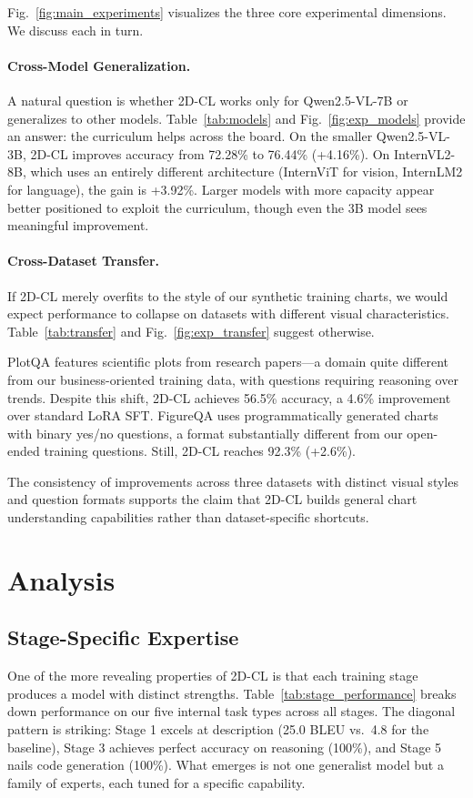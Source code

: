 \documentclass[journal]{IEEEtran}
\newcommand{\method}{2D-CL}
\begin{document}
Fig.~\ref{fig:main_experiments} visualizes the three core experimental dimensions. We discuss each in turn.

\paragraph{Cross-Model Generalization.}
A natural question is whether \method{} works only for Qwen2.5-VL-7B or generalizes to other models. Table~\ref{tab:models} and Fig.~\ref{fig:exp_models} provide an answer: the curriculum helps across the board. On the smaller Qwen2.5-VL-3B, \method{} improves accuracy from 72.28\% to 76.44\% (+4.16\%). On InternVL2-8B, which uses an entirely different architecture (InternViT for vision, InternLM2 for language), the gain is +3.92\%. Larger models with more capacity appear better positioned to exploit the curriculum, though even the 3B model sees meaningful improvement.

\paragraph{Cross-Dataset Transfer.}
If \method{} merely overfits to the style of our synthetic training charts, we would expect performance to collapse on datasets with different visual characteristics. Table~\ref{tab:transfer} and Fig.~\ref{fig:exp_transfer} suggest otherwise.

PlotQA features scientific plots from research papers---a domain quite different from our business-oriented training data, with questions requiring reasoning over trends. Despite this shift, \method{} achieves 56.5\% accuracy, a 4.6\% improvement over standard LoRA SFT. FigureQA uses programmatically generated charts with binary yes/no questions, a format substantially different from our open-ended training questions. Still, \method{} reaches 92.3\% (+2.6\%).

The consistency of improvements across three datasets with distinct visual styles and question formats supports the claim that \method{} builds general chart understanding capabilities rather than dataset-specific shortcuts.

\section{Analysis}
\subsection{Stage-Specific Expertise}
One of the more revealing properties of \method{} is that each training stage produces a model with distinct strengths. Table~\ref{tab:stage_performance} breaks down performance on our five internal task types across all stages. The diagonal pattern is striking: Stage 1 excels at description (25.0 BLEU vs.\ 4.8 for the baseline), Stage 3 achieves perfect accuracy on reasoning (100\%), and Stage 5 nails code generation (100\%). What emerges is not one generalist model but a family of experts, each tuned for a specific capability.
\end{document}
